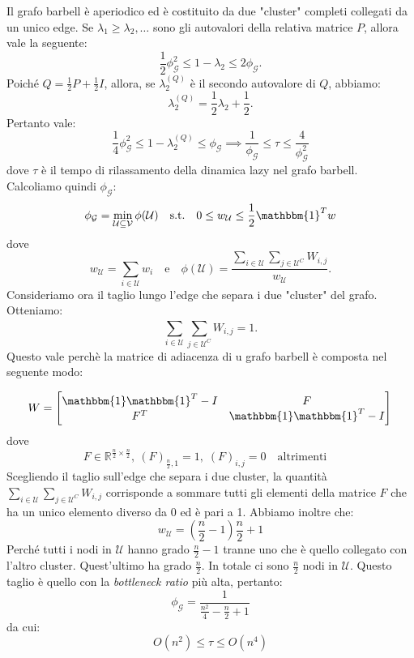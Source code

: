\begin{alphaparts}
    \questionpart
    Il grafo barbell è aperiodico ed è costituito da due "cluster" completi collegati da un unico edge. Se \(\lambda_1 \geq \lambda_2, \dots \) sono gli autovalori della relativa matrice \(P\), allora vale la seguente:
    \[\frac{1}{2} \phi_{\mathcal{G}}^2 \leq 1 - \lambda_2 \leq 2\phi_{\mathcal{G}}.\]
    Poiché \(Q = \frac{1}{2}P + \frac{1}{2}I\), allora, se \(\lambda_2^{(Q)}\) è il secondo autovalore di \(Q\), abbiamo:
    \[\lambda_2^{(Q)} = \frac{1}{2}\lambda_2 + \frac{1}{2}.\]
    Pertanto vale:
    \[\frac{1}{4} \phi_{\mathcal{G}}^2 \leq 1 - \lambda_2^{(Q)} \leq \phi_{\mathcal{G}} \implies \frac{1}{\phi_{\mathcal{G}}} \leq \tau \leq \frac{4}{\phi_{\mathcal{G}}^2}\]
    dove \(\tau\) è il tempo di rilassamento della dinamica lazy nel grafo barbell. Calcoliamo quindi \(\phi_{\mathcal{G}}\):
    \[\phi_{\mathcal{G}} = \min_{\mathcal{U}\subseteq \mathcal{V}}\phi(\mathcal{U})  \quad \text{s.t.} \quad 0 \leq w_{\mathcal{U}} \leq \frac{1}{2} \mathbbm{1}^Tw\]
    dove
    \[w_{\mathcal{U}} =  \sum \limits_{i \in \mathcal{U}}^{} w_i  \quad \text{e} \quad \phi(\mathcal{U}) = \frac{\sum \limits_{i\in \mathcal{U}}^{}  \sum \limits_{j \in \mathcal{U}^C}^{} W_{i,j}}{w_{\mathcal{U}}}.\]
    Consideriamo ora il taglio lungo l'edge che separa i due "cluster" del grafo. Otteniamo:
    \[\sum \limits_{i\in \mathcal{U}}^{}  \sum \limits_{j \in \mathcal{U}^C}^{} W_{i,j} = 1. \] 
    Questo vale perchè la matrice di adiacenza di u grafo barbell è composta nel seguente modo:
    
    \[W = \begin{bmatrix}
        \mathbbm{1}\mathbbm{1}^T - I & F \\
        F^T & \mathbbm{1}\mathbbm{1}^T - I
    \end{bmatrix}\,\] 
    dove
    \[F\in \mathbb{R}^{\frac{n}{2} \times \frac{n}{2}},\: (F)_{\frac{n}{2},1} = 1,\; (F)_{i,j} = 0  \quad \text{altrimenti} \quad\]
    Scegliendo il taglio sull'edge che separa i due cluster, la quantità \(\sum \limits_{i\in \mathcal{U}}^{}  \sum \limits_{j \in \mathcal{U}^C}^{} W_{i,j}\) corrisponde a sommare tutti gli elementi della matrice \(F\) che ha un unico elemento diverso da 0 ed è pari a 1.
    Abbiamo inoltre che:    
    \[w_{\mathcal{U}} = \left(\frac{n}{2}-1\right) \frac{n}{2} + 1\]
    Perché tutti i nodi in \(\mathcal{U}\) hanno grado 
    \(\frac{n}{2} - 1\) tranne uno che è quello collegato con l'altro cluster. Quest'ultimo ha grado \(\frac{n}{2}\). In totale ci sono \(\frac{n}{2}\) nodi in \(\mathcal{U}\). Questo taglio è quello con la \textit{bottleneck ratio} più alta, pertanto:
    \[\phi_{\mathcal{G}} = \frac{1}{\frac{n^2}{4} - \frac{n}{2} + 1}\]
    da cui:
    \[O(n^2) \leq \tau \leq O(n^4)\]


    \end{alphaparts}